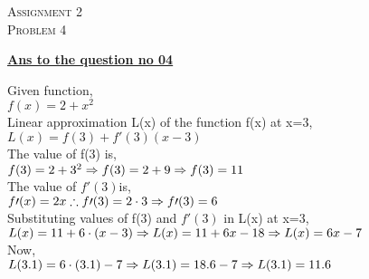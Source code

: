 \documentclass{article}
\begin{document}
\begin{newpage}
\begin{flushright}
    \textsc{Assignment 2}\\
    \textsc{Problem 4}\\
    [0.5 cm]
    \end{flushright}
\begin{center}
  \textbf{\Large \underline {Ans to the question no 04}}\\
  [0.5 cm]
\end{center}
\Large {Given function,\\[2mm]
$f(x)=2+x^2$\\[2mm]
Linear approximation L(x) of the function f(x) at x=3,\\[2mm]
$L(x)= f(3)+f\prime(3)(x-3)$\\[2mm]
The value of f(3) is,\\[2mm]
$f(3)=2+3^2\\[2mm]
\Rightarrow f(3)= 2+9\\[2mm]
\Rightarrow f(3)=11$ \\[2mm]
The value of $f\prime(3)$is,\\[2mm]
$f\prime(x)=2x\\[2mm]
\therefore f\prime(3)= 2\cdot 3\\[2mm]
\Rightarrow f\prime(3)= 6$\\[2mm]
Substituting values of f(3) and $f\prime(3)$ in L(x) at x=3,\\[2mm]
$L(x)= 11+6\cdot (x-3)\\[2mm]
\Rightarrow L(x)=11+6x-18\\[2mm]
\Rightarrow L(x)= 6x-7$\\[2mm]
Now,\\[2mm]
$L(3.1)= 6\cdot (3.1)-7\\[2mm]
\Rightarrow L(3.1)= 18.6-7\\[2mm]
\Rightarrow L(3.1)= 11.6$\\[2mm]}
\end{newpage}
\end{document}
